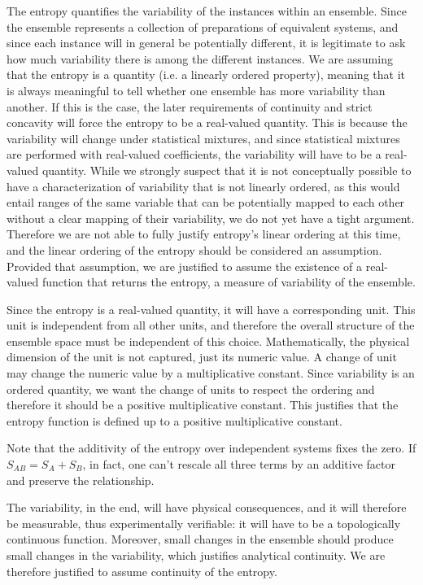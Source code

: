\begin{mathSection}
\begin{justification}
	The entropy quantifies the variability of the instances within an ensemble. Since the ensemble represents a collection of preparations of equivalent systems, and since each instance will in general be potentially different, it is legitimate to ask how much variability there is among the different instances. We are assuming that the entropy is a quantity (i.e. a linearly ordered property), meaning that it is always meaningful to tell whether one ensemble has more variability than another. If this is the case, the later requirements of continuity and strict concavity will force the entropy to be a real-valued quantity. This is because the variability will change under statistical mixtures, and since statistical mixtures are performed with real-valued coefficients, the variability will have to be a real-valued quantity. While we strongly suspect that it is not conceptually possible to have a characterization of variability that is not linearly ordered, as this would entail ranges of the same variable that can be potentially mapped to each other without a clear mapping of their variability, we do not yet have a tight argument. Therefore we are not able to fully justify entropy's linear ordering at this time, and the linear ordering of the entropy should be considered an assumption. Provided that assumption, we are justified to assume the existence of a real-valued function that returns the entropy, a measure of variability of the ensemble.
	
	Since the entropy is a real-valued quantity, it will have a corresponding unit. This unit is independent from all other units, and therefore the overall structure of the ensemble space must be independent of this choice. Mathematically, the physical dimension of the unit is not captured, just its numeric value. A change of unit may change the numeric value by a multiplicative constant. Since variability is an ordered quantity, we want the change of units to respect the ordering and therefore it should be a positive multiplicative constant. This justifies that the entropy function is defined up to a positive multiplicative constant.
	
	Note that the additivity of the entropy over independent systems fixes the zero. If $S_{AB} = S_A + S_B$, in fact, one can't rescale all three terms by an additive factor and preserve the relationship.
	
	The variability, in the end, will have physical consequences, and it will therefore be measurable, thus experimentally verifiable: it will have to be a topologically continuous function. Moreover, small changes in the ensemble should produce small changes in the variability, which justifies analytical continuity. We are therefore justified to assume continuity of the entropy.
	

\end{justification}
\end{mathSection}
